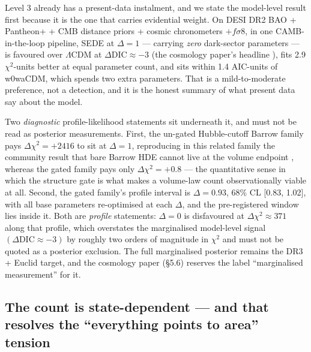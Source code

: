 \documentclass[aps,prd,preprint,nofootinbib,superscriptaddress]{revtex4-2}
\begin{document}
Level 3 already has a present-data instalment, and we state the
model-level result first because it is the one that carries evidential
weight. On DESI DR2 BAO + Pantheon+ + CMB distance priors + cosmic
chronometers \(+ f\sigma 8\), in one CAMB-in-the-loop pipeline, SEDE at
\(\Delta  = 1\) --- carrying \emph{zero} dark-sector parameters --- is
favoured over \(\Lambda \mathrm{CDM}\) at
\textbf{\(\Delta \mathrm{DIC} \approx  -3\)} (the cosmology paper's
headline \cite{Pandev:2026cosmology}), fits 2.9 \(\chi ^{2}\)-units
better at equal parameter count, and sits within 1.4 AIC-units of
w0waCDM, which spends two extra parameters. That is a mild-to-moderate
preference, not a detection, and it is the honest summary of what
present data say about the model.

Two \emph{diagnostic} profile-likelihood statements sit underneath it,
and must not be read as posterior measurements. First, the un-gated
Hubble-cutoff Barrow family pays \(\Delta \chi ^{2} = +2416\) to sit at
\(\Delta  = 1\), reproducing in this related family the community result
that bare Barrow HDE cannot live at the volume endpoint
\cite{Luciano:2025elo}, whereas the gated family pays only
\(\Delta \chi ^{2} = +0.8\) --- the quantitative sense in which the
structure gate is what makes a volume-law count observationally viable
at all. Second, the gated family's profile interval is
\(\Delta  = 0.93\), 68\% CL {[}0.83, 1.02{]}, with all base parameters
re-optimised at each \(\Delta\), and the pre-registered window lies
inside it. Both are \emph{profile} statements: \(\Delta  = 0\) is
disfavoured at \(\Delta \chi ^{2} \approx  371\) along that profile,
which overstates the marginalised model-level signal
\((\Delta \mathrm{DIC} \approx  -3)\) by roughly two orders of magnitude
in \(\chi ^{2}\) and must not be quoted as a posterior exclusion. The
full marginalised posterior remains the DR3 + Euclid target, and the
cosmology paper (§5.6) reserves the label ``marginalised measurement''
for it.

\subsection{The count is state-dependent --- and that resolves the
``everything points to area'' tension}\label{sec-7-1}
\end{document}
